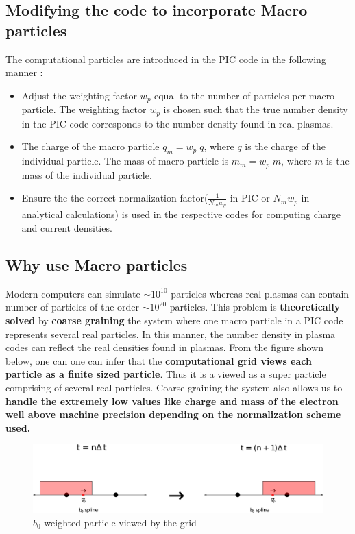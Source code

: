 \documentclass{article}
\begin{document}
\subsection*{Modifying the code to incorporate Macro particles}
The computational particles are introduced in the PIC code in the following manner :
\begin{itemize}
    \item Adjust the weighting factor $w_{p}$ equal to the number of particles per macro \\
    particle. The weighting factor $w_{p}$ is chosen such that the true number density in the PIC code corresponds to the number density found in real plasmas.
    \item The charge of the macro particle $q_{m} = w_{p}\;q$, where $q$ is the charge of the individual particle. The mass of macro particle is $m_{m} = w_{p}
    \;m$, where $m$ is the mass of the individual particle.
    \item Ensure the the correct normalization factor($\frac{1}{N_{m}w_{p}}$ in PIC or $N_{m}w_{p}$ in analytical calculations) is used in the respective codes for computing charge and current densities.
\end{itemize}
\subsection*{Why use Macro particles}
Modern computers can simulate $\sim	 10^{10}$ particles whereas real plasmas can contain number of particles of the order $\sim 10^{20}$ particles. This problem is \textbf{theoretically solved} by \textbf{coarse graining} the system where one macro particle in a PIC code represents several real particles. In this manner, the number density in plasma codes can reflect the real densities found in plasmas. From the figure shown below, one can one can infer that the \textbf{computational grid views each particle as a finite sized particle}. Thus it is a viewed as a super particle comprising of several real particles. Coarse graining the system also allows us to \textbf{handle the extremely low values like charge and mass of the electron well above machine precision depending on the normalization scheme used.} 

\begin{figure}[!htb]
\includegraphics[width=12cm]{extra_credit}
\caption{$b_{0}$ weighted particle viewed by the grid}
\end{figure}
\end{document}
